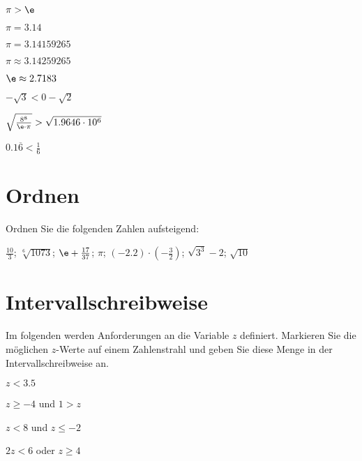 \begin{bbwAufgabenBlock}

\item
$\pi > \e$ 

\item
$\pi = 3.14$ 

\item
$\pi = 3.14159265$ 

\item
$\pi \approx 3.14259265$ 

\item
$\e \approx 2.7183$ 

\item
$-\sqrt{3} < 0 - \sqrt{2}$ 

\item
$\sqrt{\frac{8^8}{\e\cdot{}\pi}} > \sqrt{1.9646 \cdot{} 10^6}$ 

\item
$0.1\overline{6} < \frac16$ 

\end{bbwAufgabenBlock}

\platzFuerBerechnungenBisEndeSeite{}
\TRAINER{\newpage}




\section{Ordnen}
Ordnen Sie die folgenden Zahlen aufsteigend:

$\frac{10}3$; $\sqrt[6]{1073}$; $\e + \frac{17}{37}$; $\pi$;
$(-2.2)\cdot{}(-\frac32)$; $\sqrt{3^3}-2$; $\sqrt{10}$ 

\platzFuerBerechnungenBisEndeSeite{}


\section{Intervallschreibweise}
Im folgenden werden Anforderungen an die Variable $z$ definiert.
Markieren Sie die möglichen $z$-Werte auf einem Zahlenstrahl und geben
Sie diese Menge in der Intervallschreibweise an.


\begin{bbwAufgabenBlock}
\item $z<3.5$ \LoesungsRaumLang{$]-\infty; 3.5[$}

\item $z\ge -4$ und $1>z$ \LoesungsRaumLang{$[-4;1[$}

\item $z<8$ und $z\le -2$ \LoesungsRaumLang{$]-\infty;-2]$}

\item $2z<6$ oder $z\ge 4$ \LoesungsRaumLang{$]-\infty;3[ \cup  [4;\infty[$}

\end{bbwAufgabenBlock}



